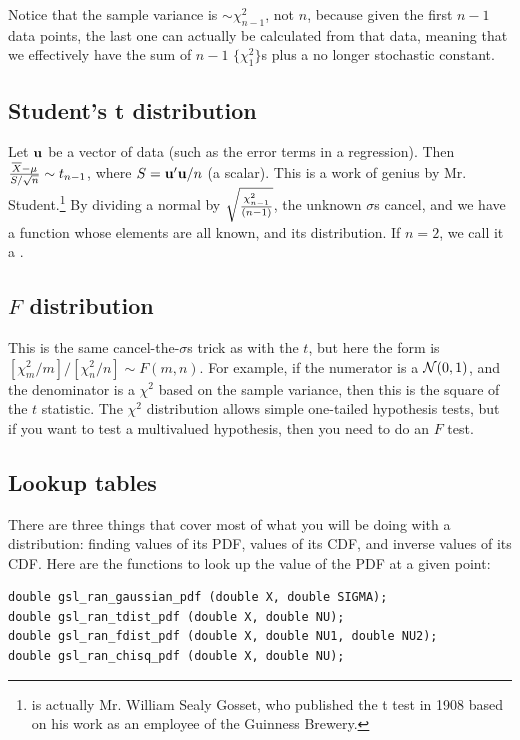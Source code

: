 Notice that the sample variance is $\sim
\chi^2_{n-1}$, not $n$, because given the first $n-1$ data points, the
last one can actually be calculated from that data, meaning that we
effectively have the sum of $n-1$ $\{\chi^2_1\}$s plus a no longer
stochastic constant.

\subsection{Student's t distribution} Let ${\bf u}$ be
a vector of data (such as the error terms in a regression). Then
${\overline X - \mu \over S/\sqrt{n}}\sim
t_{n-1}$, where $S={\bf u}'{\bf u}/n$ (a scalar). This is a work of genius by
Mr. Student.\footnote{ is actually Mr. William Sealy
Gosset, who published the t test in 1908 based on his work as an employee
of the Guinness Brewery.  }
By dividing a normal by $\sqrt{\chi^2_{n-1}\over (n-1)}$, the unknown
$\sigma$s cancel, and we have a function whose elements are all known,
and its distribution.  If $n=2$, we call it a .
\label{tstat}


\subsection{$F$ distribution}  This is the same cancel-the-$\sigma$s trick as with the $t$, but here the form
is $[\chi^2_m/m]/[\chi^2_n/n]\sim F(m,n)$. For example, if the numerator
is a ${\cal N}(0,1)$, and the denominator is a $\chi^2$ based on the
sample variance, then this is the square of the $t$ statistic.
The $\chi^2$ distribution 
allows simple one-tailed hypothesis tests, but if you want to test a
multivalued hypothesis, then you need to do an $F$ test.

\subsection{Lookup tables}
There are three things that cover most of what you will be doing with a
distribution: finding values of its PDF, values of its CDF, and inverse
values of its CDF.
Here are the functions to look up the value of the PDF at a given point:

\begin{lstlisting}
double gsl_ran_gaussian_pdf (double X, double SIGMA);
double gsl_ran_tdist_pdf (double X, double NU);
double gsl_ran_fdist_pdf (double X, double NU1, double NU2);
double gsl_ran_chisq_pdf (double X, double NU);
\end{lstlisting}

